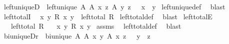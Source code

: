 \begin{isabellebody}
\isanewline
{}\isamarkupfalse%
\ left{\isacharunderscore}{\kern0pt}uniqueD{\isacharcolon}{\kern0pt}\ {\isachardoublequoteopen}{\isasymlbrakk}\ left{\isacharunderscore}{\kern0pt}unique\ A{\isacharsemicolon}{\kern0pt}\ A\ x\ z{\isacharsemicolon}{\kern0pt}\ A\ y\ z\ {\isasymrbrakk}\ {\isasymLongrightarrow}\ x\ {\isacharequal}{\kern0pt}\ y{\isachardoublequoteclose}\isanewline
%
\isadelimproof
%
\endisadelimproof
%
\isatagproof
{}\isamarkupfalse%
\ left{\isacharunderscore}{\kern0pt}unique{\isacharunderscore}{\kern0pt}def\ \isamarkupfalse%
\ blast%
\endisatagproof
{\isafoldproof}%
%
\isadelimproof
\isanewline
%
\endisadelimproof
\isanewline
{}\isamarkupfalse%
\ left{\isacharunderscore}{\kern0pt}totalI{\isacharcolon}{\kern0pt}\isanewline
\ \ {\isachardoublequoteopen}{\isacharparenleft}{\kern0pt}{\isasymAnd}x{\isachardot}{\kern0pt}\ {\isasymexists}y{\isachardot}{\kern0pt}\ R\ x\ y{\isacharparenright}{\kern0pt}\ {\isasymLongrightarrow}\ left{\isacharunderscore}{\kern0pt}total\ R{\isachardoublequoteclose}\isanewline
%
\isadelimproof
%
\endisadelimproof
%
\isatagproof
{}\isamarkupfalse%
\ left{\isacharunderscore}{\kern0pt}total{\isacharunderscore}{\kern0pt}def\ \isamarkupfalse%
\ blast%
\endisatagproof
{\isafoldproof}%
%
\isadelimproof
\isanewline
%
\endisadelimproof
\isanewline
{}\isamarkupfalse%
\ left{\isacharunderscore}{\kern0pt}totalE{\isacharcolon}{\kern0pt}\isanewline
\ \ \ {\isachardoublequoteopen}left{\isacharunderscore}{\kern0pt}total\ R{\isachardoublequoteclose}\isanewline
\ \ \ {\isachardoublequoteopen}{\isacharparenleft}{\kern0pt}{\isasymAnd}x{\isachardot}{\kern0pt}\ {\isasymexists}y{\isachardot}{\kern0pt}\ R\ x\ y{\isacharparenright}{\kern0pt}{\isachardoublequoteclose}\isanewline
%
\isadelimproof
%
\endisadelimproof
%
\isatagproof
{}\isamarkupfalse%
\ assms\ \isamarkupfalse%
\ left{\isacharunderscore}{\kern0pt}total{\isacharunderscore}{\kern0pt}def\ \isamarkupfalse%
\ blast%
\endisatagproof
{\isafoldproof}%
%
\isadelimproof
\isanewline
%
\endisadelimproof
\isanewline
{}\isamarkupfalse%
\ bi{\isacharunderscore}{\kern0pt}uniqueDr{\isacharcolon}{\kern0pt}\ {\isachardoublequoteopen}{\isasymlbrakk}\ bi{\isacharunderscore}{\kern0pt}unique\ A{\isacharsemicolon}{\kern0pt}\ A\ x\ y{\isacharsemicolon}{\kern0pt}\ A\ x\ z\ {\isasymrbrakk}\ {\isasymLongrightarrow}\ y\ {\isacharequal}{\kern0pt}\ z{\isachardoublequoteclose}\isanewline
%
\isadelimproof

\end{isabellebody}
